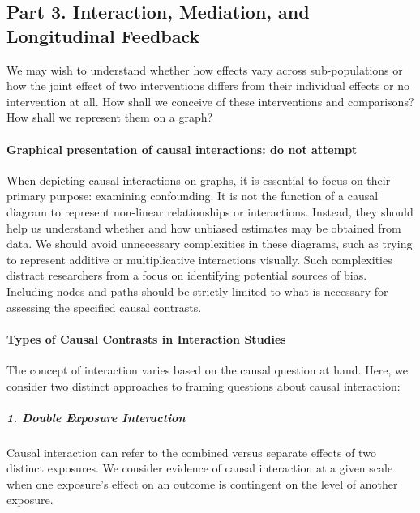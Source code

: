 \documentclass[
  singlecolumn,
  9pt]{article}
\let\oldparagraph\paragraph
\renewcommand{\paragraph}[1]{\oldparagraph{#1}\mbox{}}
\let\oldsubparagraph\subparagraph
\renewcommand{\subparagraph}[1]{\oldsubparagraph{#1}\mbox{}}
\begin{document}
\subsection{Part 3. Interaction, Mediation, and Longitudinal
Feedback}\label{part-3.-interaction-mediation-and-longitudinal-feedback}

We may wish to understand whether how effects vary across
sub-populations or how the joint effect of two interventions differs
from their individual effects or no intervention at all. How shall we
conceive of these interventions and comparisons? How shall we represent
them on a graph?

\paragraph{Graphical presentation of causal interactions: do not
attempt}\label{graphical-presentation-of-causal-interactions-do-not-attempt}

When depicting causal interactions on graphs, it is essential to focus
on their primary purpose: examining confounding. It is not the function
of a causal diagram to represent non-linear relationships or
interactions. Instead, they should help us understand whether and how
unbiased estimates may be obtained from data. We should avoid
unnecessary complexities in these diagrams, such as trying to represent
additive or multiplicative interactions visually. Such complexities
distract researchers from a focus on identifying potential sources of
bias. Including nodes and paths should be strictly limited to what is
necessary for assessing the specified causal contrasts.

\paragraph{Types of Causal Contrasts in Interaction
Studies}\label{types-of-causal-contrasts-in-interaction-studies}

The concept of interaction varies based on the causal question at hand.
Here, we consider two distinct approaches to framing questions about
causal interaction:

\subparagraph{1. Double Exposure
Interaction}\label{double-exposure-interaction}

Causal interaction can refer to the combined versus separate effects of
two distinct exposures. We consider evidence of causal interaction at a
given scale when one exposure's effect on an outcome is contingent on
the level of another exposure.
\end{document}

